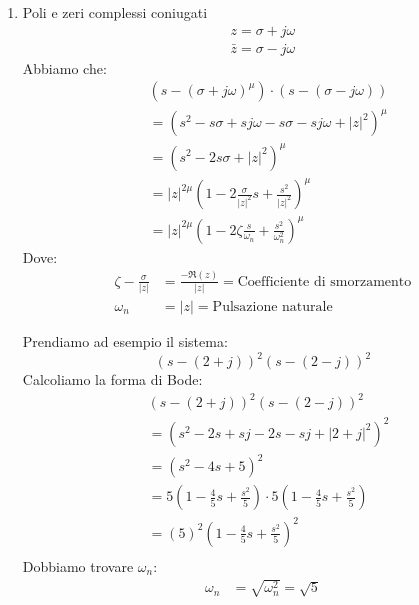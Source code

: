\documentclass[a4paper]{article}
\begin{document}
\begin{enumerate}
  \item Poli e zeri complessi coniugati
    \[
      \begin{aligned}
        z = \sigma + j \omega\\
        \bar{z} = \sigma - j \omega
      \end{aligned}
    \] 
    Abbiamo che:
    \[
      \begin{aligned}
    &\left( s - \left( \sigma  + j \omega \right)^{\mu} \right) \cdot \left( s - \left( \sigma - j \omega \right) \right)\\
    &= \left( s^2 - s \sigma  + s j \omega - s \sigma - s j \omega + |z|^2 \right)^{\mu}\\
    &= \left( s^2 - 2 s \sigma + |z|^2 \right)^{\mu}\\
    &= |z|^{2 \mu} \left( 1 - 2 \frac{\sigma }{|z|^2}s + \frac{s^2}{|z|^2} \right)^{\mu}\\
    &= |z|^{2 \mu} \left( 1 - 2 \zeta \frac{s}{\omega_n} + \frac{s^2}{\omega_n^2} \right)^{\mu}
      \end{aligned}
    \] 
    Dove:
    \[
      \begin{aligned}
        \zeta -\frac{\sigma }{|z|} &= \frac{-\Re(z)}{|z|} = \text{Coefficiente di smorzamento}\\
        \omega_n &= |z| = \text{Pulsazione naturale}
      \end{aligned}
    \] 
    \begin{example}
      Prendiamo ad esempio il sistema:
      \[
      \left( s - \left( 2 + j \right)\right)^2 \left( s - \left( 2 - j \right) \right)^2
      \] 
      Calcoliamo la forma di Bode:
      \[
      \begin{aligned}
      &\left( s - \left( 2 + j \right)\right)^2 \left( s - \left( 2 - j \right) \right)^2\\
      &= \left( s^2 - 2s + s j - 2 s - s j + |2+j|^2 \right)^2\\
      &= \left( s^2 - 4s + 5 \right)^2\\
      &= 5 \left( 1 - \frac{4}{5}s + \frac{s^2}{5} \right) \cdot 5 \left( 1 - \frac{4}{5}s + \frac{s^2}{5} \right)\\
      &= (5)^2 \left( 1 - \frac{4}{5}s + \frac{s^2}{5} \right)^2\\
      \end{aligned}
      \] 
      Dobbiamo trovare \( \omega_n \):
      \[
      \begin{aligned}
        \omega_n &= \sqrt{\omega_n^2} = \sqrt{5}\\
      \end{aligned}
\]
\end{example}
\end{enumerate}
\end{document}
